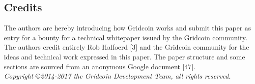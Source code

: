 \subsection{Credits}
\label{sec:credits}

The authors are hereby introducing how Gridcoin works and submit this paper as entry for a bounty for a technical whitepaper issued by the Gridcoin community. The authors credit entirely Rob Halfoerd [3] and the Gridcoin community for the ideas and technical work expressed in this paper. The paper structure and some sections are sourced from an anonymous Google document [47].\\

\medskip
\textit{Copyright \copyright  2014-2017 the Gridcoin Development Team, all rights reserved.}